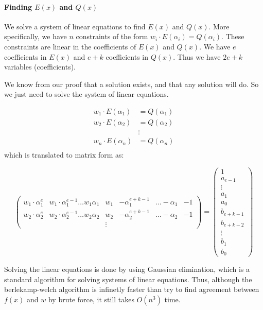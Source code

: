 \paragraph{Finding $E(x)$ and $Q(x)$}

We solve a system of linear equations to find $E(x)$ and $Q(x)$.
More specifically, we have $n$ constraints of the form $w_i\cdot E(\alpha_i)=Q(\alpha_i)$.
These constraints are linear in the coefficients of $E(x)$ and $Q(x)$.
We have $e$ coefficients in $E(x)$ and $e+k$ coefficients in $Q(x)$. Thus 
we have $2e+k$ variables (coefficients).

We know from our proof that a solution exists, and that any solution will do.
So we just need to solve the system of linear equations.

\begin{align*}
    w_1\cdot E(\alpha_1) &= Q(\alpha_1)\\
    w_2\cdot E(\alpha_2) &= Q(\alpha_2)\\
    &\vdots\\
    w_n\cdot E(\alpha_n) &= Q(\alpha_n)\\
\end{align*}
which is translated to matrix form as:

\[
    \left(\begin{array}{ccc|lcc}
        w_{1}\cdot\alpha_{1}^{e} & w_{1}\cdot\alpha_{1}^{e-1}\dots w_{1}\alpha_{1} & w_{1} & -\alpha_{1}^{e+k-1} & \dots-\alpha_{1} & -1\\
        w_{2}\cdot\alpha_{2}^{e} & w_{2}\cdot\alpha_{2}^{e-1}\dots w_{2}\alpha_{2} & w_{2} & -\alpha_{2}^{e+k-1} & \dots-\alpha_{2} & -1\\
         &  & \vdots
        \end{array}\right)=\left(\begin{array}{c}
        1\\
        a_{e-1}\\
        \vdots\\
        a_{1}\\
        a_{0}\\
        \hline b_{e+k-1}\\
        b_{e+k-2}\\
        \vdots\\
        b_{1}\\
        b_{0}
        \end{array}\right)
\]

Solving the linear equations is done by using Gaussian elimination,
which is a standard algorithm for solving systems of linear equations.
Thus, although the berlekamp-welch algorithm is infinetly faster than try to find agreement 
between $f(x)$ and $w$ by brute force, it still takes $O(n^3)$ time. 

